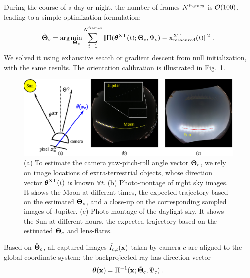 \documentclass[runningheads]{llncs}
\begin{document}
During the course of a day or night, the number of frames
  $N^{\rm frames}$ is ${\cal O}(100)$, leading to a simple optimization formulation:
\begin{equation}
 \hat{\bf \Theta}_c=\arg\min_{{\bf \Theta}_c}
 \sum_{t=1}^{N^{\rm frames}}
 \|{\Pi}({\bm \theta}^{\rm XT}(t);{\bf \Theta}_c,\Psi_c) - {\bf x}^{\rm XT}_{\rm measured}(t)\|^2
\;.
 \label{eq:hatThetac}
\end{equation}
We solved it using exhaustive search or gradient descent from null initialization, with the same results. The orientation calibration is illustrated in Fig.~\ref{fig:sunmotion}.


\begin{figure}[t!]
\begin{center}
   \includegraphics[width=0.9\linewidth]{sun_moon.eps}
\end{center}
   \vspace{-0.6cm}
   \caption{(a) To estimate the camera yaw-pitch-roll angle vector ${\bf \Theta}_c$, we rely on
   image locations of extra-terrestrial objects, whose direction vector ${\bm \theta}^{\rm XT}(t)$
   is known $\forall t$. (b) Photo-montage of night sky images. It shows the Moon at different times, the expected trajectory based on the estimated ${\bf \Theta}_c$, and a close-up on the corresponding sampled images of Jupiter. (c) Photo-montage of the daylight sky. It shows the Sun at different hours, the expected trajectory based on the estimated ${\bf \Theta}_c$ and lens-flares.
   }
\label{fig:sunmotion}
\end{figure}
Based on $\hat{\bf \Theta}_c$, all captured images $\tilde I_{c,t}(\bf x)$ taken by camera $c$ are aligned to the global coordinate system:
the backprojected ray has direction vector %
\begin{equation}
 {\bm \theta}({\bf x})={\Pi}^{-1}({\bf x};\hat{\bf{\Theta}}_c,\Psi_c)
  \;.
 \label{eq:thetac}
\end{equation}
\end{document}

